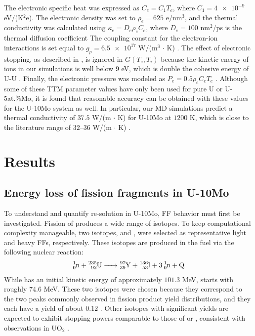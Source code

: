 \documentclass[review]{elsarticle}
\newcommand{\Y}{\ce{_{39}^{97}Y}\xspace}
\newcommand{\I}{\ce{_{53}^{136}I}\xspace}
\begin{document}
The electronic specific heat was expressed as $C_e = C_1 T_e$,
where $C_1 = \num{4e-9}$ eV/(K$^2$e).
The electronic density was set to $\rho_e = 625$ e/nm$^3$,
and the thermal conductivity was calculated using $\kappa_e = D_e \rho_e C_e$,
where $D_e = 100$ nm$^2$/ps is the thermal diffusion coefficient
The coupling constant for the electron-ion interactions
is set equal to $g_p = \num{6.5e17}$ W/(m$^3$ $\cdot$ K)
\cite{li2017, kolotova2017}.
The effect of electronic stopping,
as described in \cite{duffy2006, rutherford2007},
is ignored in $G (T_e, T_i)$
because the kinetic energy of ions in our simulations is well below $9$ eV,
which is double the cohesive energy of U-U \cite{beeler2018disp}.
Finally, the electronic pressure was modeled as $P_e = 0.5 \rho_e C_e T_e$
\cite{norman2013, pisarev2014, kolotova2017}.
Although some of these TTM parameter values have only been used
for pure U or U-5at.\%Mo,
it is found that reasonable accuracy can be obtained with these values
for the U-10Mo system as well.
In particular, our MD simulations predict
a thermal conductivity of $37.5$ W/(m $\cdot$ K) for U-10Mo at $1200$ K,
which is close to the literature range of $32$--$36$ W/(m $\cdot$ K)
\cite{burkes2010, schulthess2022}.


\section{Results}

\subsection{Energy loss of fission fragments in U-10Mo}

To understand and quantify re-solution in U-10Mo,
FF behavior must first be investigated.
Fission of  produces a wide range of isotopes.
To keep computational complexity manageable,
two isotopes, \Y and \I,
were selected as representative light and heavy FFs, respectively.
These isotopes are produced in the fuel via the following nuclear reaction:
\begin{align}
	\ce{
		_0^1n + _{92}^{235}U -> _{39}^{97}Y + _{53}^{136}I + 3 _0^1n + Q
	}
	\label{eq:iso}
\end{align}
While \Y has an initial kinetic energy of approximately $101.3$ MeV,
\I starts with roughly $74.6$ MeV.
These two isotopes were chosen because they correspond
to the two peaks commonly observed in fission product yield distributions,
and they each have a yield of about $0.12$
\cite{setyawan2018, mills1995}.
Other isotopes with significant yields are expected
to exhibit stopping powers comparable to those of \Y or \I,
consistent with observations in UO$_2$ \cite{setyawan2018}.
\end{document}
